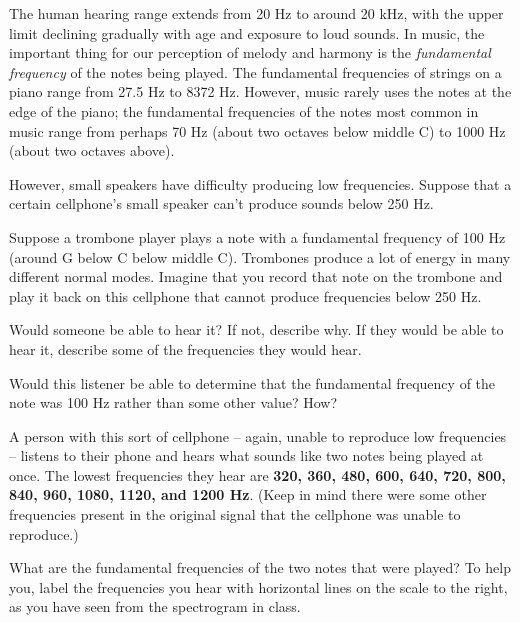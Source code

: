 \documentclass[12pt]{article}
\begin{document}
\newpage

The human hearing range extends from 20 Hz to around 20 kHz, with the upper limit declining gradually with age and exposure to loud sounds. In music, the important thing for our perception of melody and harmony is the {\it fundamental frequency} of the notes being played. The fundamental frequencies of strings on a piano range from 27.5 Hz to 8372 Hz. However, music rarely uses the notes at the edge of the piano; the fundamental frequencies of the notes most common in music range from perhaps 70 Hz (about two octaves below middle C) to 1000 Hz (about two octaves above).

However, small speakers have difficulty producing low frequencies. Suppose that a certain cellphone's small speaker can't produce sounds below 250 Hz.

Suppose a trombone player plays a note with a fundamental frequency of 100 Hz (around G below C below middle C). Trombones produce a lot of energy in many different normal modes. Imagine that you record that note on the trombone and play it back on this cellphone that cannot produce frequencies below 250 Hz. 

Would someone be able to hear it? If not, describe why. If they would be able to hear it, describe some of the frequencies they would hear.

\vspace{1.5in}

Would this listener be able to determine that the fundamental frequency of the note was 100 Hz rather than some other value? How?

\vspace{1.5in}

\newpage

A person with this sort of cellphone -- again, unable to reproduce low frequencies -- listens to their phone and hears what sounds like two notes being played at once. The lowest frequencies they hear are {\bf 320, 360, 480, 600, 640, 720, 800, 840, 960, 1080, 1120, and 1200 Hz}. (Keep in mind there were some other frequencies present in the original signal that the cellphone was unable to reproduce.)

What are the fundamental frequencies of the two notes that were played? To help you, label the frequencies you hear with horizontal lines on the scale to the right, as you have seen from the spectrogram in class.
\end{document}
